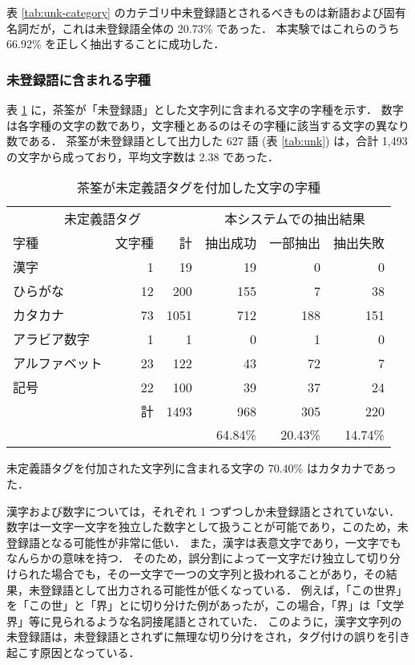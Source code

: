 表 \ref{tab:unk-category} のカテゴリ中未登録語とされるべきものは新語および固有名詞だが，これは未登録語全体の 20.73\% であった．
本実験ではこれらのうち 66.92\% を正しく抽出することに成功した．
\subsubsection{未登録語に含まれる字種}
\label{sec:unk-lettertype}
表 \ref{tab:unk-lettertype} に，茶筌が「未登録語」とした文字列に含まれる文字の字種を示す．
数字は各字種の文字の数であり，文字種とあるのはその字種に該当する文字の異なり数である．
茶筌が未登録語として出力した 627 語 (表 \ref{tab:unk}) は，合計 1,493 の文字から成っており，平均文字数は 2.38 であった．
\begin{table}[hbt]
\begin{minipage}{\textwidth}
\begin{center}
\caption{茶筌が未定義語タグを付加した文字の字種}
\label{tab:unk-lettertype}
\begin{tabular}{lrrrrr}
\hline
\hline
\multicolumn{3}{c}{未定義語タグ}& \multicolumn{3}{c}{本システムでの抽出結果} \\
字種           & 文字種 & 計  & 抽出成功 & 一部抽出 & 抽出失敗    \\
\hline
漢字           &  1     &   19 &  19 &   0 &   0 \\
ひらがな       & 12     &  200 & 155 &   7 &  38 \\
カタカナ       & 73     & 1051 & 712 & 188 & 151 \\
アラビア数字   &  1     &    1 &   0 &   1 &   0 \\
アルファベット & 23     &  122 &  43 &  72 &   7 \\
記号           & 22     &  100 &  39 &  37 &  24 \\
\hline
\multicolumn{2}{r}{計}  & 1493 & 968 & 305 & 220 \\ 
         &              &      &64.84\%&20.43\%&14.74\%\\
\hline
\hline
\end{tabular}
\end{center}
\end{minipage}
\end{table}
未定義語タグを付加された文字列に含まれる文字の 70.40\% はカタカナであった．

漢字および数字については，それぞれ 1 つずつしか未登録語とされていない．
数字は一文字一文字を独立した数字として扱うことが可能であり，このため，未登録語となる可能性が非常に低い．
また，漢字は表意文字であり，一文字でもなんらかの意味を持つ．
そのため，誤分割によって一文字だけ独立して切り分けられた場合でも，その一文字で一つの文字列と扱われることがあり，その結果，未登録語として出力される可能性が低くなっている．
例えば，「この世界」を「この世」と「界」とに切り分けた例があったが，この場合，「界」は「文学界」等に見られるような名詞接尾語とされていた．
このように，漢字文字列の未登録語は，未登録語とされずに無理な切り分けをされ，タグ付けの誤りを引き起こす原因となっている．
